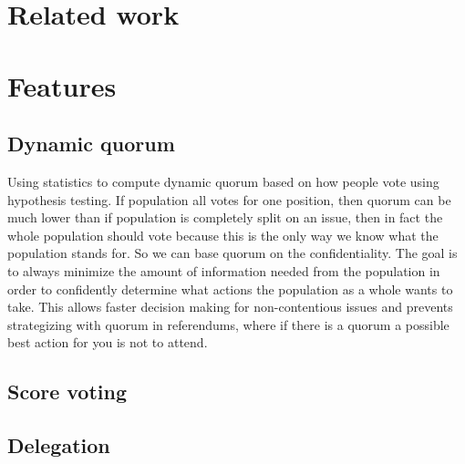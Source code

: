 \documentclass{sigchi}
\begin{document}
\section{Related work}

\cite{andersen2008trust, dirnstorfer2010voting, ford2002delegative, rodriguez2007smartocracy, yamakawa2007toward}

\section{Features}

\subsection{Dynamic quorum}

Using statistics to compute dynamic quorum based on how people vote using hypothesis testing.
If population all votes for one position, then quorum can be much lower than if population is completely split on an
issue, then in fact the whole population should vote because this is the only way we know what the population stands for.
So we can base quorum on the confidentiality.
The goal is to always minimize the amount of information needed from
the population in order to confidently determine what actions the population as a whole wants to take.
This allows faster decision making for non-contentious issues and prevents strategizing with quorum in
referendums, where if there is a quorum a possible best action for you is not to attend.


\subsection{Score voting}


\subsection{Delegation}
\end{document}
